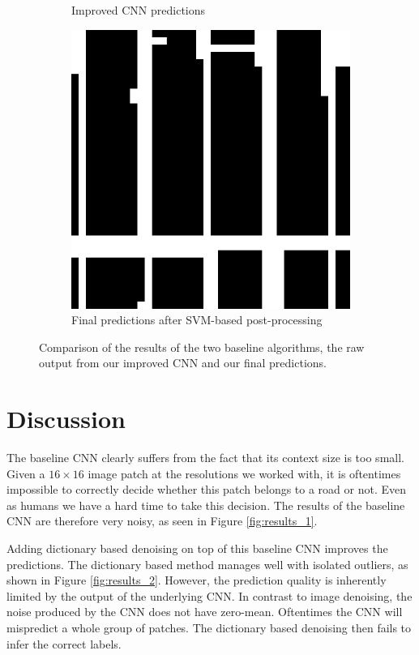 \documentclass[10pt,conference,compsocconf]{IEEEtran}
\begin{document}
\begin{figure}
\begin{subfigure}[t]{.19\textwidth}
		\caption{Improved CNN predictions}
		\label{fig:results_3}
	\end{subfigure}		
	\begin{subfigure}[t]{.19\textwidth}
		\includegraphics[width=1\textwidth]{figs/results_comparison/post_pro_final_8}
		\caption{Final predictions after SVM-based post-processing}
		\label{fig:results_4}
	\end{subfigure}	
	\caption{Comparison of the results of the two baseline algorithms, the raw output from our improved CNN and our final predictions.}	
	\label{fig:resuls}
\end{figure}

\section{Discussion}
\label{sec:discussion}
The baseline CNN clearly suffers from the fact that its context size is too small. Given a $ 16 \times 16 $ image patch at the resolutions we worked with, it is oftentimes impossible to correctly decide whether this patch belongs to a road or not. Even as humans we have a hard time to take this decision. The results of the baseline CNN are therefore very noisy, as seen in Figure \ref{fig:results_1}.

\par 
Adding dictionary based denoising on top of this baseline CNN improves the predictions. The dictionary based method manages well with isolated outliers, as shown in Figure \ref{fig:results_2}. However, the prediction quality is inherently limited by the output of the underlying CNN. In contrast to image denoising, the noise produced by the CNN does not have zero-mean. Oftentimes the CNN will mispredict a whole group of patches. The dictionary based denoising then fails to infer the correct labels. 
\end{document}
